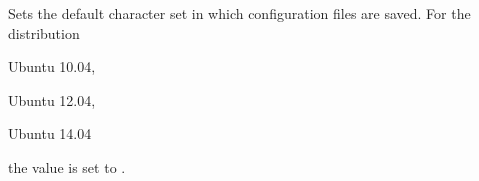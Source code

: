 
Sets the default character set  in which configuration files are 
saved. For the distribution
\begin{inparaitem}
\item[\TheDistribution{ubuntu}] Ubuntu 10.04,
\item[\TheDistribution{ubuntu}] Ubuntu 12.04,
\item[\TheDistribution{ubuntu}] Ubuntu 14.04
\end{inparaitem}
the value is set to .
